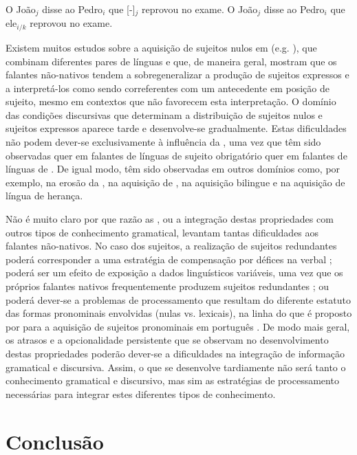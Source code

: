 \documentclass[output=paper]{LSP/langsci}
\begin{document}
\ea\label{ex:madeira_12}
\ea\label{ex:madeira_12a} O João$_j$ disse ao Pedro$_i$ que [-]$_j$ reprovou no exame.
\ex\label{ex:madeira_12b} O João$_j$ disse ao Pedro$_i$ que ele$_{i/k}$ reprovou no exame.
\zl

Existem muitos estudos sobre a aquisição de sujeitos nulos em  (e.g. \citealt{montrulrodriguez2006,soracefiliaci2006,rothman2009,madeira_etal2012}), que combinam diferentes pares de línguas e que, de maneira geral, mostram que os falantes não-nativos tendem a sobregeneralizar a produção de sujeitos expressos e a interpretá-los como sendo correferentes com um antecedente em posição de sujeito, mesmo em contextos que não favorecem esta interpretação. O domínio das condições discursivas que determinam a  distribuição de sujeitos nulos e sujeitos expressos aparece tarde e desenvolve-se gradualmente. Estas dificuldades não podem dever-se exclusivamente à influência da , uma vez que têm sido observadas quer em falantes de línguas de sujeito obrigatório quer em falantes de línguas de . De igual modo, têm sido observadas em outros domínios como, por exemplo, na erosão da , na aquisição de , na aquisição bilingue e na aquisição de língua de herança.

Não é muito claro por que razão as , ou a integração destas propriedades com outros tipos de conhecimento gramatical, levantam tantas dificuldades aos falantes não-nativos. No caso dos sujeitos, a realização de sujeitos redundantes poderá corresponder a uma estratégia de compensação por défices na  verbal \citep{margazabel2006}; poderá ser um efeito de exposição a dados linguísticos variáveis, uma vez que os próprios falantes nativos frequentemente produzem sujeitos redundantes \citep{rothman2009}; ou poderá dever-se a problemas de processamento que resultam do diferente estatuto das formas pronominais envolvidas (nulas vs. lexicais), na linha do que é proposto por \citet{costaambulate2010} para a aquisição de sujeitos pronominais em português . De modo mais geral, os atrasos e a opcionalidade persistente que se observam no desenvolvimento destas propriedades poderão dever-se a dificuldades na integração de informação gramatical e discursiva. Assim, o que se desenvolve tardiamente não será tanto o conhecimento gramatical e discursivo, mas sim as estratégias de processamento necessárias para integrar estes diferentes tipos de conhecimento.  

\section{Conclusão}
\label{sec:madeira_conclusao}
\end{document}
